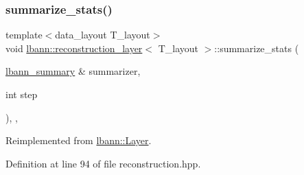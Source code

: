 \subsubsection{\texorpdfstring{summarize\+\_\+stats()}{summarize\_stats()}}
{\footnotesize\ttfamily template$<$data\+\_\+layout T\+\_\+layout$>$ \\
void \hyperlink{classlbann_1_1reconstruction__layer}{lbann\+::reconstruction\+\_\+layer}$<$ T\+\_\+layout $>$\+::summarize\+\_\+stats (\begin{DoxyParamCaption}\item[{\hyperlink{classlbann_1_1lbann__summary}{lbann\+\_\+summary} \&}]{summarizer,  }\item[{int}]{step }\end{DoxyParamCaption})\hspace{0.3cm}{\ttfamily [inline]}, {\ttfamily [override]}, {\ttfamily [virtual]}}



Reimplemented from \hyperlink{classlbann_1_1Layer_a7f3f26e2ae0497f9a00fd6bc56b50543}{lbann\+::\+Layer}.



Definition at line 94 of file reconstruction.\+hpp.


